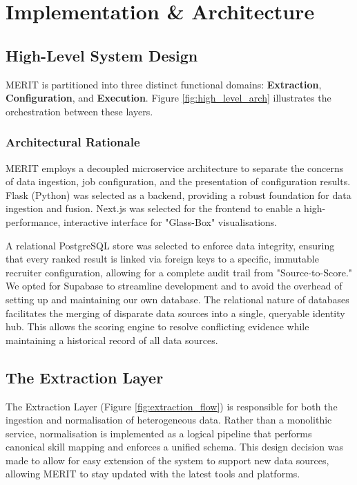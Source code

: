 
\section{Implementation \& Architecture}


\subsection{High-Level System Design}
MERIT is partitioned into three distinct functional domains: 
\textbf{Extraction}, \textbf{Configuration}, and \textbf{Execution}. 
Figure \ref{fig:high_level_arch} illustrates the orchestration between these layers.



\subsubsection{Architectural Rationale}
MERIT employs a decoupled microservice architecture to separate the 
concerns of data ingestion, job configuration, and the presentation of configuration results.
Flask (Python) was selected as a backend, providing a robust foundation for data 
ingestion and fusion. Next.js was selected for the frontend to enable a high-performance, 
interactive interface for "Glass-Box" visualisations.

A relational PostgreSQL store was selected to enforce data integrity, ensuring that every 
ranked result is linked via foreign keys to a specific, immutable recruiter configuration, 
allowing for a complete audit trail from "Source-to-Score." We opted for Supabase to 
streamline development and to avoid the overhead of setting up and maintaining our own database.
The relational nature of databases facilitates the merging of disparate data sources
into a single, queryable identity hub. This allows the scoring engine to resolve conflicting 
evidence while maintaining a historical record of all data sources.

\subsection{The Extraction Layer}
The Extraction Layer (Figure \ref{fig:extraction_flow}) is responsible for both the ingestion and 
normalisation of heterogeneous data. Rather than a monolithic service, normalisation is 
implemented as a logical pipeline that performs canonical skill mapping and enforces a unified schema. 
This design decision was made to allow for easy extension of the system to support new 
data sources, allowing MERIT to stay updated with the latest tools and platforms.

